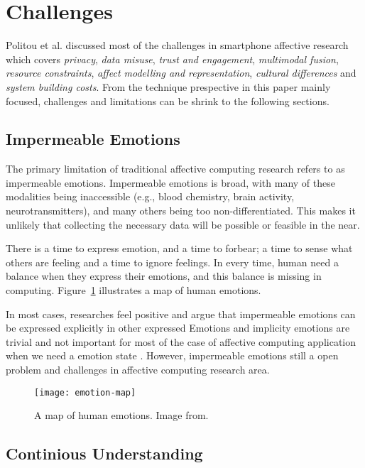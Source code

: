 \section{Challenges}\label{sec:challenges}

Politou et al. \cite{Politou2017} discussed most of the challenges in smartphone affective research which covers \emph{privacy}, \emph{data misuse}, \emph{trust and engagement}, \emph{multimodal fusion}, \emph{resource constraints}, \emph{affect modelling and representation}, \emph{cultural differences} and \emph{system building costs}. From the technique prespective in this paper mainly focused, challenges and limitations can be shrink to the following sections.

\subsection{Impermeable Emotions}

The primary limitation of traditional affective computing research refers to as impermeable emotions\cite{picard2003affective}. Impermeable emotions is broad, with many of these modalities being inaccessible (e.g., blood chemistry, brain activity, neurotransmitters), and many others being too non-differentiated. This makes it unlikely that collecting the necessary data will be possible or feasible in the near. 

There is a time to express emotion, and a time to forbear; a time to sense what others are feeling and a time to ignore feelings. In every time, human need a balance when they express their emotions, and this balance is missing in computing. Figure~\ref{fig:emotions} illustrates a map of human emotions.

In most cases, researches feel positive and argue that impermeable emotions can be expressed explicitly in other expressed Emotions\cite{parkinson1995ideas} and implicity emotions are trivial and not important for most of the case of affective computing application when we need a emotion state \cite{Zhang2014}. However, impermeable emotions still a open problem and challenges in affective computing research area.

\begin{figure}[htb]
    \centering
    \texttt{[image: emotion-map]}
    \caption{A map of human emotions. Image from\cite{emotionmap}.}
    \label{fig:emotions}
\end{figure}


\subsection{Continious Understanding}

